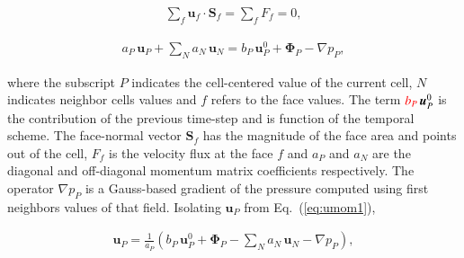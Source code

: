 \documentclass[final,3p,times,10pt,onecolumn]{myElsarticle}
\numberwithin{equation}{section}
\begin{document}
\begin{equation}
\begin{split}
\sum_{f} \boldsymbol{u}_{f} \cdotp \textbf{S}_{f} = \sum_{f} F_f = 0, 
\end{split}
\label{eq:mass2} 
\end{equation}

\begin{equation}
\begin{split}
a_P\,\boldsymbol{u}_P + \sum_{N} a_{N}\,\boldsymbol{u}_{N} = b_P\, \boldsymbol{u}^0_P + \boldsymbol{\Phi}_P - \nabla p_P,
\label{eq:umom1}
\end{split}
\end{equation}

\noindent where the subscript $P$ indicates the cell-centered value of the current cell, $N$ indicates neighbor cells values and $f$ refers to the face values. The term ${\color{red}b_P}\, \boldsymbol{u}^0_P$ is the contribution of the previous time-step and is function of the temporal scheme. {\color{red} The face-normal vector $\textbf{S}_{f}$ has the magnitude of the face area and points out of the cell}, $F_f$ is the {\color{red} velocity} flux at the face $f$ and $a_P$ and $a_{N}$ are the diagonal and off-diagonal momentum matrix coefficients respectively. The operator $\nabla p_P$ is a Gauss-based gradient of the pressure computed using first neighbors values of that field. Isolating $\boldsymbol{u}_P$ from Eq.~(\ref{eq:umom1}),

\begin{equation}
\begin{split}
\boldsymbol{u}_P = \frac{1}{a_P}\left(b_P\, \boldsymbol{u}^0_P + \boldsymbol{\Phi}_P - \sum_{N} a_{N}\, \boldsymbol{u}_{N} - \nabla p_P\right),
\label{eq:uP}
\end{split}
\end{equation}
\end{document}
